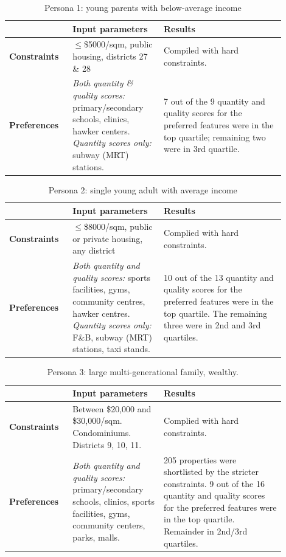 \documentclass[a4paper, 11pt]{article}
\begin{document}
\begin{table}[ht]
    \centering
    \begin{tabular}{p{0.2\linewidth} | p{0.3\linewidth} | p{0.4\linewidth}} \hline
      & \textbf{Input parameters}  & \textbf{Results} \\ \hline
      \textbf{Constraints}& $\leq$\$5000/sqm, public housing, districts 27 \& 28
  & Compiled with hard constraints. \\ \hline
\textbf{Preferences} & \textit{Both quantity \& quality scores:} primary/secondary schools, clinics, hawker centers. \textit{Quantity scores only:} subway (MRT) stations. & 7 out of the 9 quantity and quality scores for the preferred features were in the top quartile; remaining two were in 3rd quartile. \\\hline
    \end{tabular}
    \caption{Persona 1: young parents with below-average income}
    \label{tab:my_label}
\end{table}

\begin{table}[ht]
    \centering
    \begin{tabular}{p{0.2\linewidth} | p{0.3\linewidth} | p{0.4\linewidth}} \hline
      & \textbf{Input parameters}  & \textbf{Results} \\ \hline
      \textbf{Constraints}& $\leq$\$8000/sqm, public or private housing, any district & Complied with hard constraints. \\ \hline
\textbf{Preferences} &
\textit{Both quantity and quality scores:} sports facilities, gyms, community centres, hawker centres. \textit{Quantity scores only:} F\&B, subway (MRT) stations, taxi stands. &
10 out of the 13 quantity and quality scores for the preferred features were in the top quartile. The remaining three were in 2nd and 3rd quartiles.

 \\\hline
    \end{tabular}
    \caption{Persona 2: single young adult with average income}
    \label{tab:my_label}
\end{table}


\begin{table}[ht]
    \centering
    \begin{tabular}{p{0.2\linewidth} | p{0.3\linewidth} | p{0.4\linewidth}} \hline
      & \textbf{Input parameters}  & \textbf{Results} \\ \hline
      \textbf{Constraints}& Between \$20,000 and \$30,000/sqm. Condominiums. Districts 9, 10, 11.
 & Complied with hard constraints. \\ \hline
\textbf{Preferences} &
\textit{Both quantity and quality scores:} primary/secondary schools, clinics, sports facilities, gyms, community centers, parks, malls. & 205 properties were shortlisted by the stricter constraints.
9 out of the 16 quantity and quality scores for the preferred features were in the top quartile. Remainder in 2nd/3rd quartiles.

 \\\hline
    \end{tabular}
    \caption{Persona 3: large multi-generational family, wealthy.
}
    \label{tab:my_label}
\end{table}
\end{document}
